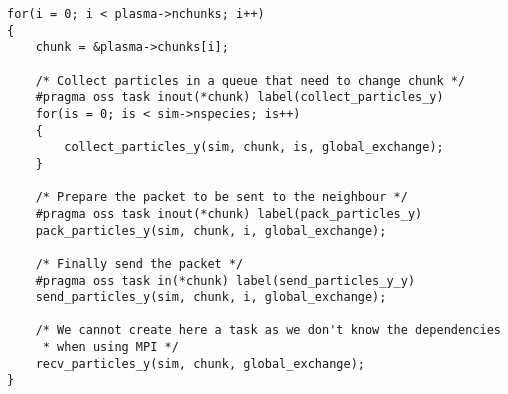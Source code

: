 \begin{lstlisting}
for(i = 0; i < plasma->nchunks; i++)
{
	chunk = &plasma->chunks[i];

	/* Collect particles in a queue that need to change chunk */
	#pragma oss task inout(*chunk) label(collect_particles_y)
	for(is = 0; is < sim->nspecies; is++)
	{
		collect_particles_y(sim, chunk, is, global_exchange);
	}

	/* Prepare the packet to be sent to the neighbour */
	#pragma oss task inout(*chunk) label(pack_particles_y)
	pack_particles_y(sim, chunk, i, global_exchange);

	/* Finally send the packet */
	#pragma oss task in(*chunk) label(send_particles_y_y)
	send_particles_y(sim, chunk, i, global_exchange);

	/* We cannot create here a task as we don't know the dependencies
	 * when using MPI */
	recv_particles_y(sim, chunk, global_exchange);
}
\end{lstlisting}
